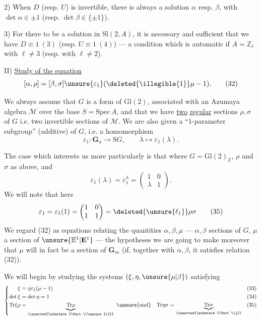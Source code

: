 2) When $D$ (resp. $U$) is invertible, there is always a solution $\alpha$ resp. $\beta$, with $\det\alpha\in\pm1$ (resp. $\det\beta\in\{\pm1\}$).

3) For there to be a solution in $\mathrm{Sl}(2,A)$, it is necessary and sufficient that we have $D\equiv1\ (3)$ (resp. $U\equiv1\ (4)$) --- a condition which is automatic if $A=\mathbb{Z}_\ell$ with $\ell\ne3$ (resp. with $\ell\ne2$).

II) \uline{Study  of the equation}
\[
[\alpha,\rho]=[\beta,\sigma]\unsure{\varepsilon_1}(\deleted{\illegible{1}}\mu-1). \tag{32}
\]

We always assume that $G$ is a form of $\mathrm{Gl}(2)$, associated with an Azumaya algebra $\mathcal M$ over the base $S=\mathrm{Spec}\,A$, and that we have \uline{two} \uline{regular} sections $\rho,\sigma$ of $G$ i.e. two invertible sections of $\mathcal M$. We are also given a ``$1$-parameter subgroup'' (additive) of $G$, i.e. a homomorphism
\[
\varepsilon_1:\mathbf G_a\longrightarrow \mathrm{S}G,\qquad \lambda\longmapsto\varepsilon_1(\lambda). \tag{33}
\]


The case which interests us more particularly is that where $G=\mathrm{Gl}(2)_{\mathbb{Z}}$, $\rho$ and $\sigma$ as above, and
\[
\varepsilon_1(\lambda)=\varepsilon_1^\lambda=\begin{pmatrix}1&0\\\lambda&1\end{pmatrix}. \tag{34}
\]
We will note that here
\[
\varepsilon_1=\varepsilon_1(1)=\begin{pmatrix}1&0\\1&1\end{pmatrix}=\deleted{\unsure{\ell_1}}\rho\sigma \tag{35}
\]
We regard (32) as equations relating the quantities $\alpha,\beta,\mu$ --- $\alpha,\beta$  sections of $G$, $\mu$ a section of $\unsure{\mathbb E^1|\mathbf E^1}$ --- the hypotheses we are going to make  moreover that $\mu$ will in fact be a section of $\mathbf G_m$ (if, together with $\alpha,\beta$, it satisfies relation (32)). 

We will begin by studying the systems  $(\xi,\eta,\unsure{\mu|\beta})$ satisfying
\[
\left\{\begin{aligned}
\xi&=\eta\varepsilon_1(\mu-1) && (33)\\
\det\xi&=\det\eta=1 && (34)\\
\mathrm{Tr}\xi\rho&=\underbrace{\mathrm{Tr}\rho}_{\inserted{\substack{\Vert\\\unsure{i}}}}\ \unsure{\text{and}}\quad
\mathrm{Tr}\eta\sigma=\underbrace{\mathrm{Tr}\sigma}_{\inserted{\substack{\Vert\\j}}} && (35)
\end{aligned}\right.
\]

